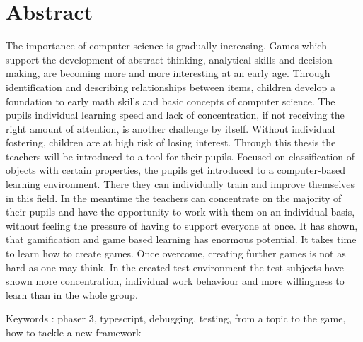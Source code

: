 
\chapter*{Abstract}
The importance of computer science is gradually increasing. Games which support the development of abstract thinking,
analytical skills and decision-making, are becoming more and more interesting at an early age.
Through identification and describing relationships between items, children develop a foundation to early
math skills and basic concepts of computer science.
The pupils individual learning speed and lack of concentration, if not receiving the right amount of attention,
is another challenge by itself.
Without individual fostering, children are at high risk of losing interest.
Through this thesis the teachers will be introduced to a tool for their pupils.
Focused on classification of objects with certain properties,
the pupils get introduced to a computer-based learning environment.
There they can individually train and improve themselves in this field.
In the meantime the teachers can concentrate on the majority of their pupils and have the opportunity to work with
them on an individual basis, without feeling the pressure of having to support everyone at once.
It has shown, that gamification and game based learning has enormous potential.
It takes time to learn how to create games. Once overcome, creating further games is not as hard as one may think.
In the created test environment the test subjects have shown more concentration,
individual work behaviour and more willingness to learn than in the whole group.

Keywords : phaser 3, typescript, debugging, testing, from a topic to the game, how to tackle a new framework
